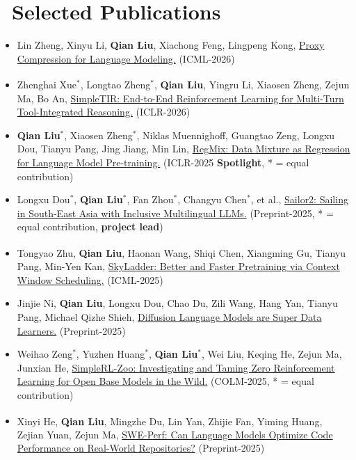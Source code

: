 \documentclass{resume}
\begin{document}
\section{\faBook\ Selected Publications}
\begin{itemize}[parsep=0.5ex]
    \item Lin Zheng, Xinyu Li, \textbf{Qian Liu}, Xiachong Feng, Lingpeng Kong, \href{https://arxiv.org/abs/2602.04289}{Proxy Compression for Language Modeling.} (ICML-2026)
    \item Zhenghai Xue$^*$, Longtao Zheng$^*$, \textbf{Qian Liu}\textsuperscript{\Letter}, Yingru Li, Xiaosen Zheng, Zejun Ma, Bo An, \href{https://arxiv.org/abs/2509.02479}{SimpleTIR: End-to-End Reinforcement Learning for Multi-Turn Tool-Integrated Reasoning.} (ICLR-2026)
    \item \textbf{Qian Liu}$^*$, Xiaosen Zheng$^*$, Niklas Muennighoff, Guangtao Zeng, Longxu Dou, Tianyu Pang, Jing Jiang, Min Lin, \href{https://arxiv.org/abs/2407.01492}{RegMix: Data Mixture as Regression for Language Model Pre-training.} (ICLR-2025 {\color{red}\textbf{Spotlight}}, * = equal contribution)
    \item Longxu Dou$^*$, \textbf{Qian Liu}$^*$, Fan Zhou$^*$, Changyu Chen$^*$, et al., \href{https://arxiv.org/abs/2502.12982}{Sailor2: Sailing in South-East Asia with Inclusive Multilingual LLMs.} (Preprint-2025, * = equal contribution, \textbf{project lead})
    \item Tongyao Zhu, \textbf{Qian Liu}\textsuperscript{\Letter}, Haonan Wang, Shiqi Chen, Xiangming Gu, Tianyu Pang, Min-Yen Kan, \href{https://arxiv.org/abs/2503.15450}{SkyLadder: Better and Faster Pretraining via Context Window Scheduling.} (ICML-2025)
    \item Jinjie Ni, \textbf{Qian Liu}, Longxu Dou, Chao Du, Zili Wang, Hang Yan, Tianyu Pang, Michael Qizhe Shieh, \href{https://arxiv.org/abs/2511.03276}{Diffusion Language Models are Super Data Learners.} (Preprint-2025)
    \item Weihao Zeng$^*$, Yuzhen Huang$^*$, \textbf{Qian Liu}$^*$, Wei Liu, Keqing He, Zejun Ma, Junxian He, \href{https://arxiv.org/abs/2503.18892}{SimpleRL-Zoo: Investigating and Taming Zero Reinforcement Learning for Open Base Models in the Wild.} (COLM-2025, * = equal contribution)
    \item Xinyi He, \textbf{Qian Liu}\textsuperscript{\Letter}, Mingzhe Du, Lin Yan, Zhijie Fan, Yiming Huang, Zejian Yuan, Zejun Ma, \href{https://arxiv.org/abs/2507.12415}{SWE-Perf: Can Language Models Optimize Code Performance on Real-World Repositories?} (Preprint-2025)

\end{itemize}
\end{document}

